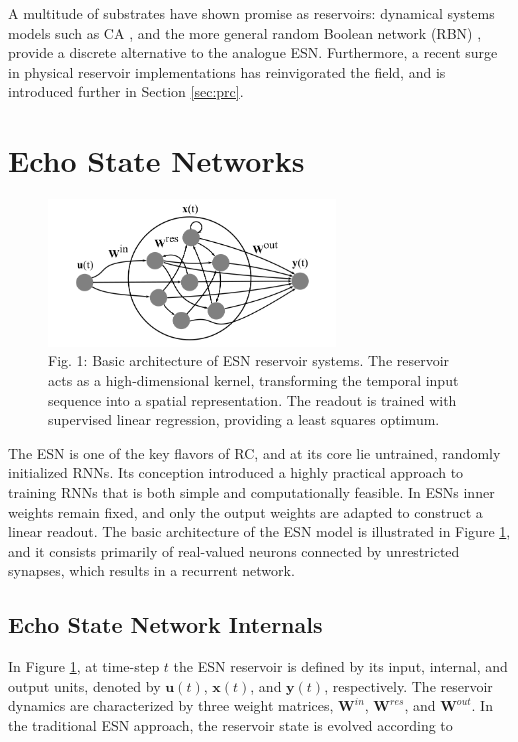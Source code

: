 A multitude of substrates have shown promise as reservoirs: dynamical systems
models such as CA \cite{yilmaz_reservoir_2014}, and the more general random
Boolean network (RBN) \cite{snyder_computational_2013}, provide a discrete
alternative to the analogue ESN. Furthermore, a recent surge in physical
reservoir implementations has reinvigorated the field, and is introduced further
in Section \ref{sec:prc}.

\section{Echo State Networks}

\begin{figure}[t!]
  \centering
  \includegraphics[width=3.0in]{figures/esn.png}
  \caption{
    Fig. 1: Basic architecture of ESN reservoir systems. The reservoir acts as a
high-dimensional kernel, transforming the temporal input sequence into a spatial
representation. The readout is trained with supervised linear regression,
providing a least squares optimum.
  }
  \label{fig:esn}
\end{figure}

The ESN is one of the key flavors of RC, and at its core lie untrained, randomly
initialized RNNs. Its conception introduced a highly practical approach to
training RNNs that is both simple and computationally feasible. In ESNs inner
weights remain fixed, and only the output weights are adapted to construct a
linear readout. The basic architecture of the ESN model is illustrated in Figure
\ref{fig:esn}, and it consists primarily of real-valued neurons connected by
unrestricted synapses, which results in a recurrent network.

\subsection{Echo State Network Internals}

In Figure \ref{fig:esn}, at time-step $t$ the ESN reservoir is defined by its
input, internal, and output units, denoted by $\mathbf{u}(t)$, $\mathbf{x}(t)$,
and $\mathbf{y}(t)$, respectively. The reservoir dynamics are characterized by
three weight matrices, $\mathbf{W}^{in}$, $\mathbf{W}^{res}$, and
$\mathbf{W}^{out}$. In the traditional ESN approach, the reservoir state is
evolved according to


